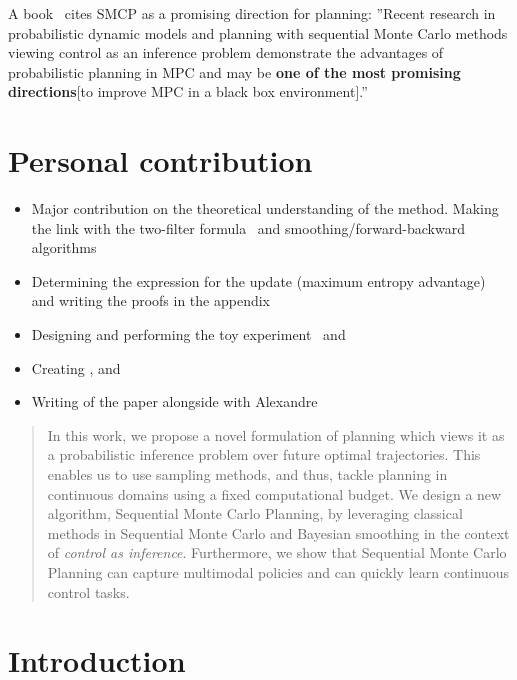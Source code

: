A book~\citep{belousov2021reinforcement} cites SMCP as a promising direction for planning: ''Recent research in probabilistic dynamic models and planning
with sequential Monte Carlo methods viewing control as an inference problem demonstrate the advantages of probabilistic planning in MPC and may be \textbf{one of the most promising directions}[to improve MPC in a black box environment].''


\section*{Personal contribution}
\begin{itemize}
    \item Major contribution on the theoretical understanding of the method.
        Making the link with the two-filter formula~\citep{bresler1986two} and smoothing/forward-backward algorithms
    \item Determining the expression for the update (maximum entropy advantage)
        and writing the proofs in the appendix
    \item Designing and performing the toy experiment~ and 
    \item Creating ,  and 
    \item Writing of the paper alongside with Alexandre
\end{itemize}

\newpage
\begin{abstract}
In this work, we propose a novel formulation of planning which views it as a probabilistic inference problem over future optimal trajectories. This enables us to use sampling methods, and thus, tackle planning in continuous %
domains using a fixed computational budget.  We design a new algorithm, Sequential Monte Carlo Planning, by leveraging classical methods in Sequential Monte Carlo and Bayesian smoothing in the context of \textit{control as inference}.  %
Furthermore, we show that Sequential Monte Carlo Planning can capture multimodal policies and can quickly learn continuous control tasks. %
\end{abstract}

\section{Introduction}

